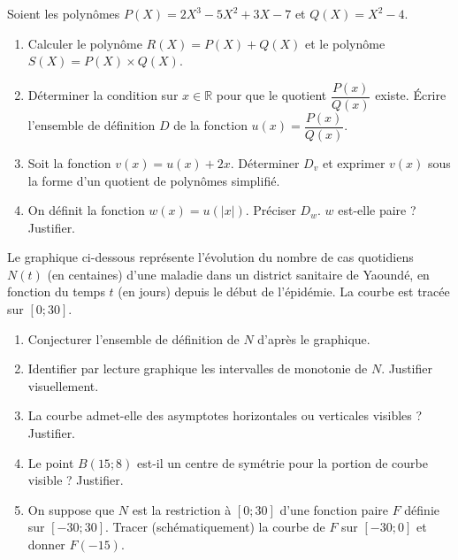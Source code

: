 \documentclass[11pt]{article}
\begin{document}
\begin{exercice}
Soient les polynômes $P(X) = 2X^3 - 5X^2 + 3X - 7$ et $Q(X) = X^2 - 4$.
\begin{enumerate}
    \item Calculer le polynôme $R(X) = P(X) + Q(X)$ et le polynôme $S(X) = P(X) \times Q(X)$.
    \item Déterminer la condition sur $x \in \mathbb{R}$ pour que le quotient $\dfrac{P(x)}{Q(x)}$ existe. Écrire l'ensemble de définition $D$ de la fonction $u(x) = \dfrac{P(x)}{Q(x)}$.
    \item Soit la fonction $v(x) = u(x) + 2x$. Déterminer $D_v$ et exprimer $v(x)$ sous la forme d'un quotient de polynômes simplifié.
    \item On définit la fonction $w(x) = u(|x|)$. Préciser $D_w$. $w$ est-elle paire ? Justifier.
\end{enumerate}
\end{exercice}

\begin{exercice}
Le graphique ci-dessous représente l'évolution du nombre de cas quotidiens $N(t)$ (en centaines) d'une maladie dans un district sanitaire de Yaoundé, en fonction du temps $t$ (en jours) depuis le début de l'épidémie. La courbe est tracée sur $[0 ; 30]$.
\begin{center}
\end{center}
\begin{enumerate}
    \item Conjecturer l'ensemble de définition de $N$ d'après le graphique.
    \item Identifier par lecture graphique les intervalles de monotonie de $N$. Justifier visuellement.
    \item La courbe admet-elle des asymptotes horizontales ou verticales visibles ? Justifier.
    \item Le point $B(15; 8)$ est-il un centre de symétrie pour la portion de courbe visible ? Justifier.
    \item On suppose que $N$ est la restriction à $[0;30]$ d'une fonction paire $F$ définie sur $[-30;30]$. Tracer (schématiquement) la courbe de $F$ sur $[-30;0]$ et donner $F(-15)$.
\end{enumerate}
\end{exercice}
\end{document}
